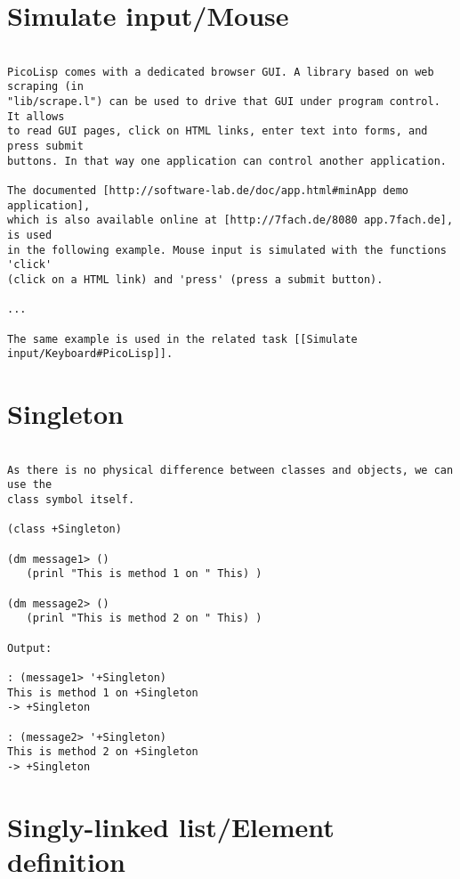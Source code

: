 \section*{Simulate input/Mouse}

\begin{verbatim}

PicoLisp comes with a dedicated browser GUI. A library based on web scraping (in
"lib/scrape.l") can be used to drive that GUI under program control. It allows
to read GUI pages, click on HTML links, enter text into forms, and press submit
buttons. In that way one application can control another application.

The documented [http://software-lab.de/doc/app.html#minApp demo application],
which is also available online at [http://7fach.de/8080 app.7fach.de], is used
in the following example. Mouse input is simulated with the functions 'click'
(click on a HTML link) and 'press' (press a submit button).

...

The same example is used in the related task [[Simulate input/Keyboard#PicoLisp]].

\end{verbatim}

\section*{Singleton}

\begin{verbatim}

As there is no physical difference between classes and objects, we can use the
class symbol itself.

(class +Singleton)

(dm message1> ()
   (prinl "This is method 1 on " This) )

(dm message2> ()
   (prinl "This is method 2 on " This) )

Output:

: (message1> '+Singleton)
This is method 1 on +Singleton
-> +Singleton

: (message2> '+Singleton)
This is method 2 on +Singleton
-> +Singleton

\end{verbatim}

\section*{Singly-linked list/Element definition}

